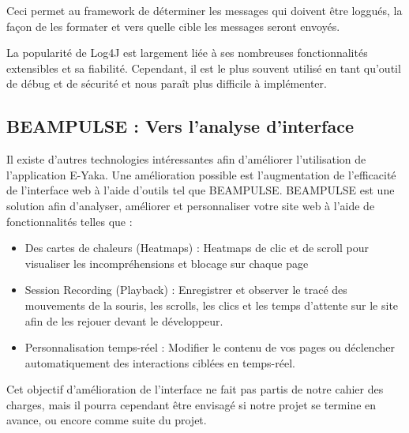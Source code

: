 	Ceci permet au framework de déterminer les messages qui doivent être loggués, la façon de les formater et vers quelle cible les messages seront envoyés.

	La popularité de Log4J est largement liée à  ses nombreuses fonctionnalités extensibles et sa fiabilité. Cependant, il est le plus souvent utilisé en tant qu'outil de débug et de sécurité et nous paraît plus difficile à implémenter.
	
	\subsection{BEAMPULSE : Vers l'analyse d'interface}
	
	Il existe d'autres technologies intéressantes afin d'améliorer l'utilisation de l'application E-Yaka. Une  amélioration possible est l'augmentation de l'efficacité de l'interface web à l'aide d'outils tel que BEAMPULSE. BEAMPULSE est une solution afin d'analyser, améliorer et personnaliser votre site web à l'aide de fonctionnalités telles que :
	\begin{itemize}
	\item Des cartes de chaleurs (Heatmaps) : Heatmaps de clic et de scroll pour visualiser les incompréhensions et blocage sur chaque page
	
    \item Session Recording (Playback) : Enregistrer et observer le tracé des mouvements de la souris, les scrolls, les clics et les temps d'attente sur le site afin de les rejouer devant le développeur.
    \item Personnalisation temps-réel : Modifier le contenu de vos pages ou déclencher automatiquement des interactions ciblées en temps-réel.

\end{itemize}
	
	Cet objectif d'amélioration de l'interface ne fait pas partis de notre cahier des charges, mais il pourra cependant être envisagé si notre projet se termine en avance, ou encore comme suite du projet.
	 

